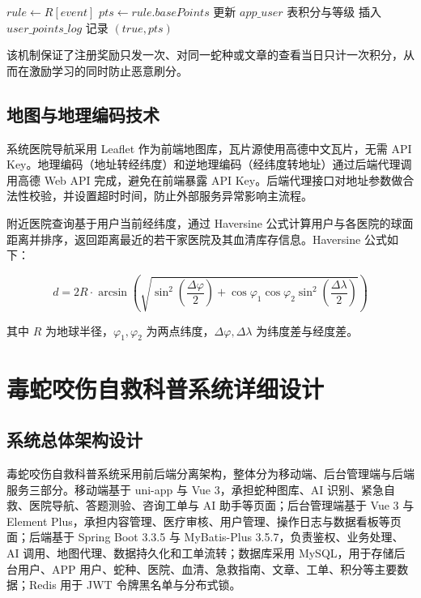 \documentclass[12pt, a4paper, oneside]{ctexrep}
\begin{document}
\begin{algorithm}[H]
\caption{积分发放核心逻辑}
\label{alg:points}
$rule \leftarrow R[event]$\;
$pts \leftarrow rule.basePoints$\;
更新 $app\_user$ 表积分与等级\;
插入 $user\_points\_log$ 记录\;
\Return $(true, pts)$\;
\end{algorithm}

该机制保证了注册奖励只发一次、对同一蛇种或文章的查看当日只计一次积分，从而在激励学习的同时防止恶意刷分。

\section{地图与地理编码技术}
系统医院导航采用 Leaflet 作为前端地图库，瓦片源使用高德中文瓦片，无需 API Key。地理编码（地址转经纬度）和逆地理编码（经纬度转地址）通过后端代理调用高德 Web API 完成，避免在前端暴露 API Key。后端代理接口对地址参数做合法性校验，并设置超时时间，防止外部服务异常影响主流程。

附近医院查询基于用户当前经纬度，通过 Haversine 公式计算用户与各医院的球面距离并排序，返回距离最近的若干家医院及其血清库存信息。Haversine 公式如下：

\begin{equation}
d = 2R \cdot \arcsin\left(\sqrt{\sin^2\left(\frac{\Delta\varphi}{2}\right) + \cos\varphi_1 \cos\varphi_2 \sin^2\left(\frac{\Delta\lambda}{2}\right)}\right)
\end{equation}

其中 $R$ 为地球半径，$\varphi_1,\varphi_2$ 为两点纬度，$\Delta\varphi,\Delta\lambda$ 为纬度差与经度差。

\chapter{毒蛇咬伤自救科普系统详细设计}

\section{系统总体架构设计}
毒蛇咬伤自救科普系统采用前后端分离架构，整体分为移动端、后台管理端与后端服务三部分。移动端基于 uni-app 与 Vue 3，承担蛇种图库、AI 识别、紧急自救、医院导航、答题测验、咨询工单与 AI 助手等页面；后台管理端基于 Vue 3 与 Element Plus，承担内容管理、医疗审核、用户管理、操作日志与数据看板等页面；后端基于 Spring Boot 3.3.5 与 MyBatis-Plus 3.5.7，负责鉴权、业务处理、AI 调用、地图代理、数据持久化和工单流转；数据库采用 MySQL，用于存储后台用户、APP 用户、蛇种、医院、血清、急救指南、文章、工单、积分等主要数据；Redis 用于 JWT 令牌黑名单与分布式锁。
\end{document}
